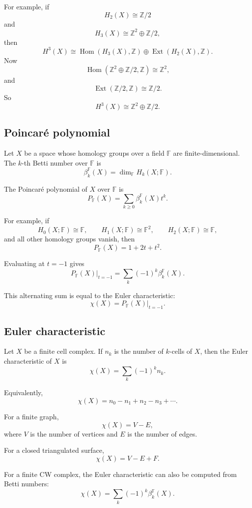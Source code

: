 \documentclass[12pt,a4paper]{article}
\theoremstyle{notespace}
\begin{document}
For example, if
\[
H_2(X)\cong \mathbb Z/2
\]
and
\[
H_3(X)\cong \mathbb Z^2\oplus \mathbb Z/2,
\]
then
\[
H^3(X)
\cong
\operatorname{Hom}(H_3(X),\mathbb Z)
\oplus
\operatorname{Ext}(H_2(X),\mathbb Z).
\]
Now
\[
\operatorname{Hom}(\mathbb Z^2\oplus \mathbb Z/2,\mathbb Z)
\cong
\mathbb Z^2,
\]
and
\[
\operatorname{Ext}(\mathbb Z/2,\mathbb Z)
\cong
\mathbb Z/2.
\]
So
\[
H^3(X)\cong \mathbb Z^2\oplus \mathbb Z/2.
\]

\subsection{Poincaré polynomial}

Let \(X\) be a space whose homology groups over a field \(\mathbb F\) are finite-dimensional. The \(k\)-th Betti number over \(\mathbb F\) is
\[
\beta_k^{\mathbb F}(X)
=
\dim_{\mathbb F}H_k(X;\mathbb F).
\]

The Poincaré polynomial of \(X\) over \(\mathbb F\) is
\[
P_{\mathbb F}(X)
=
\sum_{k\geq 0}
\beta_k^{\mathbb F}(X)t^k.
\]

For example, if
\[
H_0(X;\mathbb F)\cong \mathbb F,
\qquad
H_1(X;\mathbb F)\cong \mathbb F^2,
\qquad
H_2(X;\mathbb F)\cong \mathbb F,
\]
and all other homology groups vanish, then
\[
P_{\mathbb F}(X)=1+2t+t^2.
\]

Evaluating at \(t=-1\) gives
\[
P_{\mathbb F}(X)\big|_{t=-1}
=
\sum_k (-1)^k\beta_k^{\mathbb F}(X).
\]

This alternating sum is equal to the Euler characteristic:
\[
\chi(X)=P_{\mathbb F}(X)\big|_{t=-1}.
\]

\subsection{Euler characteristic}

Let \(X\) be a finite cell complex. If \(n_k\) is the number of \(k\)-cells of \(X\), then the Euler characteristic of \(X\) is
\[
\chi(X)=\sum_k (-1)^k n_k.
\]

Equivalently,
\[
\chi(X)
=
n_0-n_1+n_2-n_3+\cdots.
\]

For a finite graph,
\[
\chi(X)=V-E,
\]
where \(V\) is the number of vertices and \(E\) is the number of edges.

For a closed triangulated surface,
\[
\chi(X)=V-E+F.
\]

For a finite CW complex, the Euler characteristic can also be computed from Betti numbers:
\[
\chi(X)=\sum_k (-1)^k\beta_k^{\mathbb F}(X).
\]
\end{document}
